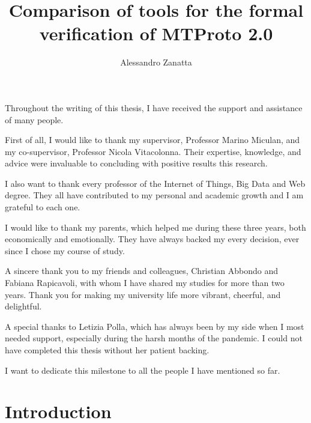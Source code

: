 \documentclass[target=bach,aauheader=]{thud}
\title{Comparison of tools for the formal verification of MTProto 2.0}
\author{Alessandro Zanatta}
\begin{document}
\maketitle


\acknowledgements
Throughout the writing of this thesis, I have received the support and assistance of many people.

First of all, I would like to thank my supervisor, Professor Marino Miculan, and my co-supervisor, Professor Nicola Vitacolonna. Their expertise, knowledge, and advice were invaluable to concluding with positive results this research.

I also want to thank every professor of the Internet of Things, Big Data and Web degree. They all have contributed to my personal and academic growth and I am grateful to each one.

I would like to thank my parents, which helped me during these three years, both economically and emotionally. They have always backed my every decision, ever since I chose my course of study.

A sincere thank you to my friends and colleagues, Christian Abbondo and Fabiana Rapicavoli, with whom I have shared my studies for more than two years. Thank you for making my university life more vibrant, cheerful, and delightful.

A special thanks to Letizia Polla, which has always been by my side when I most needed support, especially during the harsh months of the pandemic. I could not have completed this thesis without her patient backing.

I want to dedicate this milestone to all the people I have mentioned so far.


\tableofcontents



\mainmatter

\chapter{Introduction}

\end{document}
